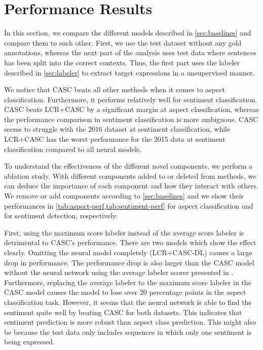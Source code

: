 \documentclass[american, oneside]{ecsgdp}
\begin{document}
\section{Performance Results} \label{sec:performance}
In this section, we compare the different models described in \cref{sec:baselines} and compare them to each other. First, we use the test dataset without any gold annotations, whereas the next part of the analysis uses test data where sentences has been split into the correct contexts. Thus, the first part uses the labeler described in \cref{sec:labeler} to extract target expressions in a unsupervised manner.

We notice that CASC beats all other methods when it comes to aspect classification. Furthermore, it performs relatively well for sentiment classification. CASC beats LCR+CASC by a significant margin at aspect classification, whereas the performance comparison in sentiment classification is more ambiguous. CASC seems to struggle with the 2016 dataset at sentiment classification, while LCR+CASC has the worst performance for the 2015 data at sentiment classification compared to all neural models.

To understand the effectiveness of the different novel components, we perform a ablation study. With different components added to or deleted from methods, we can deduce the importance of each component and how they interact with others. We remove or add components according to \cref{sec:baselines} and we show their performances in \cref{tab:aspect-perf,tab:sentiment-perf} for aspect classification and for sentiment detection, respectively.

First, using the maximum score labeler instead of the average score labeler is detrimental to CASC's performance. There are two models which show the effect clearly. Omitting the neural model completely (LCR+CASC-DL) causes a large drop in performance. The performance drop is also larger than the CASC model without the neural network using the average labeler scorer presented in \textcite{Kumar2021CASC}. Furthermore, replacing the average labeler to the maximum score labeler in the CASC model causes the model to lose over 20 percentage points in the aspect classification task. However, it seems that the neural network is able to find the sentiment quite well by beating CASC for both datasets. This indicates that sentiment prediction is more robust than aspect class prediction. This might also be because the test data only includes sequences in which only one sentiment is being expressed.
\end{document}
